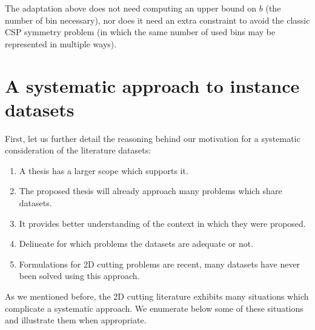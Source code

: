 \documentclass[ppgc,prop-tese,english,formais,babel]{iiufrgs}
\begin{document}
The adaptation above does not need computing an upper bound on \(b\) (the number of bin necessary), nor does it need an extra constraint to avoid the classic CSP symmetry problem (in which the same number of used bins may be represented in multiple ways).

\section{A systematic approach to instance datasets}

First, let us further detail the reasoning behind our motivation for a systematic consideration of the literature datasets:

\begin{enumerate}
\item A thesis has a larger scope which supports it.
\item The proposed thesis will already approach many problems which share datasets.
\item It provides better understanding of the context in which they were proposed.
\item Delineate for which problems the datasets are adequate or not.
\item Formulations for 2D cutting problems are recent, many datasets have never been solved using this approach.
\end{enumerate}

As we mentioned before, the 2D cutting literature exhibits many situations which complicate a systematic approach.
We enumerate below some of these situations and illustrate them when appropriate.
\end{document}
